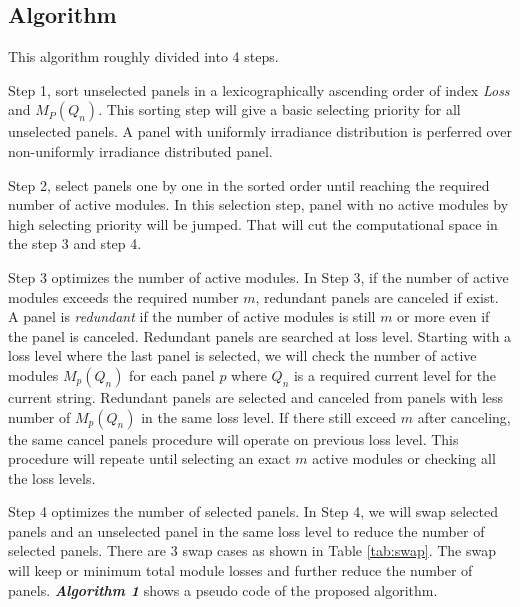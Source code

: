 \documentclass[conference]{pvsctran}
\begin{document}
\subsection{Algorithm}
This algorithm roughly divided into 4 steps.

Step 1, sort unselected panels in a lexicographically ascending order of index \textit{Loss} and $M_{P}(Q_{n})$.
This sorting step will give a basic selecting priority for all unselected panels. A panel with uniformly irradiance distribution is perferred over non-uniformly irradiance distributed panel.

Step 2, select panels one by one in the sorted order until reaching the required number of active modules.
In this selection step, panel with no active modules by high selecting priority will be jumped.
That will cut the computational space in the step 3 and step 4.

Step 3 optimizes the number of active modules. 
In Step 3, if the number of active modules exceeds the required number $m$, redundant panels are canceled if exist. 
A panel is \textit{redundant} if the number of active modules is still $m$ or more even if the panel is canceled.  
Redundant panels are searched at loss level. 
Starting with a loss level where the last panel is selected, we will check the number of active modules $M_{p}(Q_{n})$ for each panel $p$ 
where $Q_{n}$ is a required current level for the current string.
Redundant panels are selected and canceled from panels with less number of $M_{p}(Q_{n})$ in the same loss level. 
If there still exceed $m$ after canceling,
the same cancel panels procedure will operate on previous loss level.
This procedure will repeate until selecting an exact $m$ active modules or checking all the loss levels.

Step 4 optimizes the number of selected panels.
In Step 4, we will swap selected panels and an unselected panel in the same loss level to reduce the number of selected panels.
There are 3 swap cases as shown in Table \ref{tab:swap}.
The swap will keep or minimum total module losses and further reduce the number of panels.
\textbf{\textit{Algorithm 1}} shows a pseudo code of the proposed algorithm.
\end{document}
